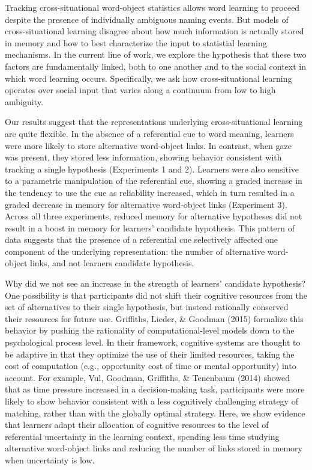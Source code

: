 \documentclass[a4paper,man,floatsintext]{apa6}
\begin{document}
Tracking cross-situational word-object statistics allows word learning
to proceed despite the presence of individually ambiguous naming events.
But models of cross-situational learning disagree about how much
information is actually stored in memory and how to best characterize
the input to statistial learning mechanisms. In the current line of
work, we explore the hypothesis that these two factors are fundamentally
linked, both to one another and to the social context in which word
learning occurs. Specifically, we ask how cross-situational learning
operates over social input that varies along a continuum from low to
high ambiguity.

Our results suggest that the representations underlying
cross-situational learning are quite flexible. In the absence of a
referential cue to word meaning, learners were more likely to store
alternative word-object links. In contrast, when gaze was present, they
stored less information, showing behavior consistent with tracking a
single hypothesis (Experiments 1 and 2). Learners were also sensitive to
a parametric manipulation of the referential cue, showing a graded
increase in the tendency to use the cue as reliability increased, which
in turn resulted in a graded decrease in memory for alternative
word-object links (Experiment 3). Across all three experiments, reduced
memory for alternative hypotheses did not result in a boost in memory
for learners' candidate hypothesis. This pattern of data suggests that
the presence of a referential cue selectively affected one component of
the underlying representation: the number of alternative word-object
links, and not learners candidate hypothesis.

Why did we not see an increase in the strength of learners' candidate
hypothesis? One possibility is that participants did not shift their
cognitive resources from the set of alternatives to their single
hypothesis, but instead rationally conserved their resources for future
use. Griffiths, Lieder, \& Goodman (2015) formalize this behavior by
pushing the rationality of computational-level models down to the
psychological process level. In their framework, cognitive systems are
thought to be adaptive in that they optimize the use of their limited
resources, taking the cost of computation (e.g., opportunity cost of
time or mental opportunity) into account. For example, Vul, Goodman,
Griffiths, \& Tenenbaum (2014) showed that as time pressure increased in
a decision-making task, participants were more likely to show behavior
consistent with a less cognitively challenging strategy of matching,
rather than with the globally optimal strategy. Here, we show evidence
that learners adapt their allocation of cognitive resources to the level
of referential uncertainty in the learning context, spending less time
studying alternative word-object links and reducing the number of links
stored in memory when uncertainty is low.
\end{document}
